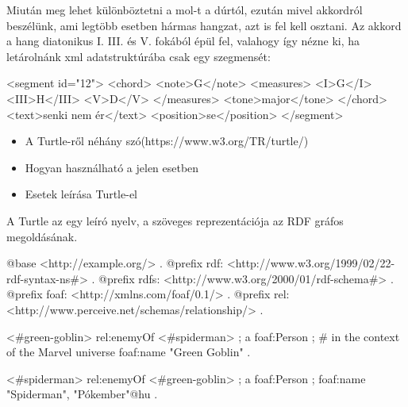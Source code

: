Miután meg lehet különböztetni a mol-t a dúrtól, ezután mivel akkordról beszélünk, ami legtöbb esetben hármas hangzat, azt is fel kell osztani. Az akkord a hang diatonikus I. III. és V. fokából épül fel, valahogy így nézne ki, ha letárolnánk xml adatstruktúrába csak egy szegmensét:
\begin{xml}
<segment id="12">
   <chord>
      <note>G</note>
      <measures>
         <I>G</I>
         <III>H</III>
         <V>D</V>
      </measures>
      <tone>major</tone>
   </chord>
   <text>senki nem ér</text>
   <position>se</position>
</segment>
\end{xml}

\begin{itemize}
\item A Turtle-ről néhány szó(https://www.w3.org/TR/turtle/)
\item Hogyan használható a jelen esetben
\item Esetek leírása Turtle-el
\end{itemize}

A Turtle az egy leíró nyelv, a szöveges reprezentációja az RDF gráfos megoldásának.
\begin{xml}
@base <http://example.org/> .
@prefix rdf: <http://www.w3.org/1999/02/22-rdf-syntax-ns#> .
@prefix rdfs: <http://www.w3.org/2000/01/rdf-schema#> .
@prefix foaf: <http://xmlns.com/foaf/0.1/> .
@prefix rel: <http://www.perceive.net/schemas/relationship/> .

<#green-goblin>
	rel:enemyOf <#spiderman> ;
	a foaf:Person ;    # in the context of the Marvel universe
	foaf:name "Green Goblin" .

<#spiderman>
	rel:enemyOf <#green-goblin> ;
	a foaf:Person ;
	foaf:name "Spiderman", "Pókember"@hu .
\end{xml}




